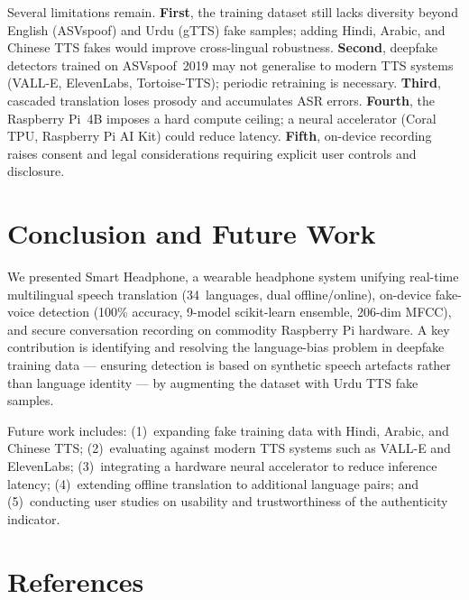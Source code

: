 \documentclass[10pt,twocolumn]{article}
\begin{document}
Several limitations remain. \textbf{First}, the training dataset still lacks
diversity beyond English (ASVspoof) and Urdu (gTTS) fake samples; adding Hindi,
Arabic, and Chinese TTS fakes would improve cross-lingual robustness.
\textbf{Second}, deepfake detectors trained on ASVspoof~2019 may not generalise
to modern TTS systems (VALL-E, ElevenLabs, Tortoise-TTS); periodic retraining is
necessary. \textbf{Third}, cascaded translation loses prosody and accumulates ASR
errors. \textbf{Fourth}, the Raspberry Pi~4B imposes a hard compute ceiling; a
neural accelerator (Coral TPU, Raspberry Pi AI Kit) could reduce latency.
\textbf{Fifth}, on-device recording raises consent and legal considerations
requiring explicit user controls and disclosure.

\section{Conclusion and Future Work}

We presented Smart Headphone, a wearable headphone system unifying real-time
multilingual speech translation (34~languages, dual offline/online), on-device
fake-voice detection (100\% accuracy, 9-model scikit-learn ensemble, 206-dim MFCC),
and secure conversation recording on commodity Raspberry Pi hardware. A key
contribution is identifying and resolving the language-bias problem in deepfake
training data — ensuring detection is based on synthetic speech artefacts rather
than language identity — by augmenting the dataset with Urdu TTS fake samples.

Future work includes: (1)~expanding fake training data with Hindi, Arabic, and
Chinese TTS; (2)~evaluating against modern TTS systems such as VALL-E and
ElevenLabs; (3)~integrating a hardware neural accelerator to reduce inference
latency; (4)~extending offline translation to additional language pairs; and
(5)~conducting user studies on usability and trustworthiness of the authenticity
indicator.

\section*{References}
\begingroup
\footnotesize
\setlength{\parskip}{3pt}
\end{document}
